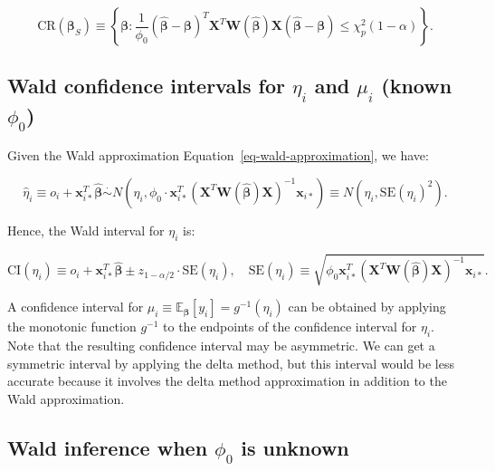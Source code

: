 \documentclass[
  11pt,
  letterpaper,
  oneside]{book}
\theoremstyle{plain}
\theoremstyle{plain}
\theoremstyle{definition}
\theoremstyle{definition}
\theoremstyle{plain}
\theoremstyle{remark}
\begin{document}
\[
\text{CR}(\boldsymbol{\beta}_S) \equiv \left\{\boldsymbol{\beta}: \frac{1}{\phi_0} (\boldsymbol{\widehat \beta} - \boldsymbol{\beta})^T \boldsymbol{X}^T \boldsymbol{W}(\boldsymbol{\widehat \beta}) \boldsymbol{X} (\boldsymbol{\widehat \beta} - \boldsymbol{\beta}) \leq \chi^2_{p}(1-\alpha)\right\}.
\]

\hypertarget{sec-wald-ci-fitted-values}{%
\subsection{\texorpdfstring{Wald confidence intervals for \(\eta_i\) and
\(\mu_i\) (known
\(\phi_0\))}{Wald confidence intervals for \textbackslash eta\_i and \textbackslash mu\_i (known \textbackslash phi\_0)}}\label{sec-wald-ci-fitted-values}}

Given the Wald approximation Equation~\ref{eq-wald-approximation}, we
have:

\[
\widehat \eta_i \equiv o_i + \boldsymbol{x}_{i*}^T \boldsymbol{\widehat \beta} \overset{\cdot}{\sim} N(\eta_i, \phi_0 \cdot \boldsymbol{x}_{i*}^T (\boldsymbol{X}^T \boldsymbol{W}(\boldsymbol{\widehat \beta}) \boldsymbol{X})^{-1} \boldsymbol{x}_{i*}) \equiv N(\eta_i, \text{SE}(\eta_i)^2).
\]

Hence, the Wald interval for \(\eta_i\) is:

\[
\text{CI}(\eta_i) \equiv o_i + \boldsymbol{x}_{i*}^T \boldsymbol{\widehat\beta} \pm z_{1-\alpha/2} \cdot \text{SE}(\eta_i), \quad \text{SE}(\eta_i) \equiv \sqrt{\phi_0 \boldsymbol{x}_{i*}^T (\boldsymbol{X}^T \boldsymbol{W}(\boldsymbol{\widehat \beta}) \boldsymbol{X})^{-1} \boldsymbol{x}_{i*}}.
\]

A confidence interval for
\(\mu_i \equiv \mathbb{E}_{\boldsymbol{\beta}}[y_i] = g^{-1}(\eta_i)\)
can be obtained by applying the monotonic function \(g^{-1}\) to the
endpoints of the confidence interval for \(\eta_i\). Note that the
resulting confidence interval may be asymmetric. We can get a symmetric
interval by applying the delta method, but this interval would be less
accurate because it involves the delta method approximation in addition
to the Wald approximation.

\hypertarget{sec-wald-inference-unknown-dispersion}{%
\subsection{\texorpdfstring{Wald inference when \(\phi_0\) is
unknown}{Wald inference when \textbackslash phi\_0 is unknown}}\label{sec-wald-inference-unknown-dispersion}}
\end{document}
